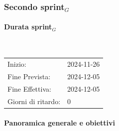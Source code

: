 \documentclass[10pt]{article}
\begin{document}
{{%

\newpage
\subsubsection{Secondo sprint$_G$}
\label{secondo-sprint$_G$}
    
    \paragraph{Durata sprint$_G$}\mbox{}\\
    \vspace{-1.5em}
    \begin{table}[h] 
    \renewcommand{\arraystretch}{1.2}  
    \begin{tabular}{ l l }
        Inizio: & 2024-11-26 \\
        Fine Prevista: & 2024-12-05 \\
        Fine Effettiva: & 2024-12-05 \\
        Giorni di ritardo: & 0 \\
    \end{tabular}
    \end{table}
    \vspace{-2em}
    {\renewcommand{\arraystretch}{1.5}%
    
    \paragraph{Panoramica generale e obiettivi}\mbox{}\vspace{0.4em}
    
}}}
\end{document}
